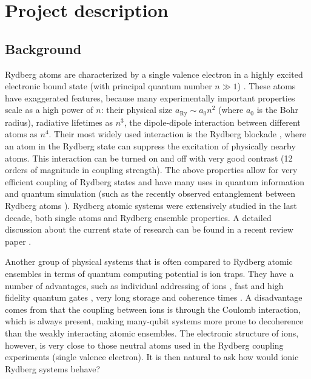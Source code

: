 \section{Project description}

\subsection{Background}

Rydberg atoms are characterized by a single valence electron in a highly excited electronic bound state (with principal quantum number $n \gg 1$) \cite{Gallagher1994}. These atoms have exaggerated features, because many experimentally important properties scale as a high power of $n$: their physical size $a_\mathrm{Ry} \sim a_0 n^2$ (where $a_0$ is the Bohr radius), radiative lifetimes as $n^3$, the dipole-dipole interaction between different atoms as $n^4$. Their most widely used interaction is the Rydberg blockade \cite{Jaksch2000}, where an atom in the Rydberg state can suppress the excitation of physically nearby atoms. This interaction can be turned on and off with very good contrast (12 orders of magnitude in coupling strength). The above properties allow for very efficient coupling of Rydberg states and have many uses in quantum information and quantum simulation (such as the recently observed entanglement between Rydberg atoms \cite{Wilk2010}). Rydberg atomic systems were extensively studied in the last decade, both single atoms and Rydberg ensemble properties. A detailed discussion about the current state of research can be found in a recent review paper \cite{Saffman2010}.

Another group of physical systems that is often compared to Rydberg atomic ensembles in terms of quantum computing potential is ion traps. They have a number of advantages, such as individual addressing of ions \cite{Nagerl1999}, fast and high fidelity quantum gates \cite{Benhelm2008}, very long storage and coherence times \cite{Lucas2007}. A disadvantage comes from that the coupling between ions is through the Coulomb interaction, which is always present, making many-qubit systems more prone to decoherence than the weakly interacting atomic ensembles. The electronic structure of ions, however, is very close to those neutral atoms used in the Rydberg coupling experiments (single valence electron). It is then natural to ask how would ionic Rydberg systems behave?

